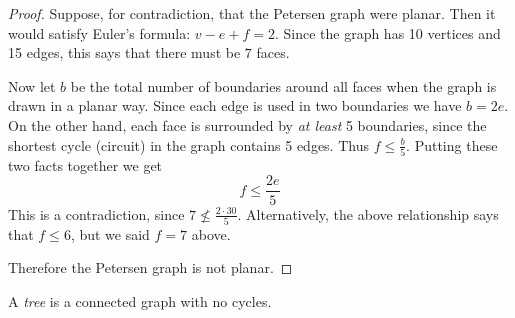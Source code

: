 \begin{questions}
  \begin{center}
  \end{center}

  \begin{solution}
    \begin{proof}
      Suppose, for contradiction, that the Petersen graph were planar.  Then it would satisfy Euler's formula: $v - e + f = 2$.  Since the graph has 10 vertices and 15 edges, this says that there must be $7$ faces.

      Now let $b$ be the total number of boundaries around all faces when the graph is drawn in a planar way.  Since each edge is used in two boundaries we have $b = 2e$.  On the other hand, each face is surrounded by {\em at least} 5 boundaries, since the shortest cycle (circuit) in the graph contains 5 edges.  Thus $f \le \frac{b}{5}$.  Putting these two facts together we get
      \[f \le \frac{2e}{5}\]
      This is a contradiction, since $7 \not\le \frac{2\cdot 30}{5}$.  Alternatively, the above relationship says that $f \le 6$, but we said $f = 7$ above.

      Therefore the Petersen graph is not planar.
    \end{proof}

  \end{solution}


  \question[9] A {\em tree} is a connected graph with no cycles.
\end{questions}
